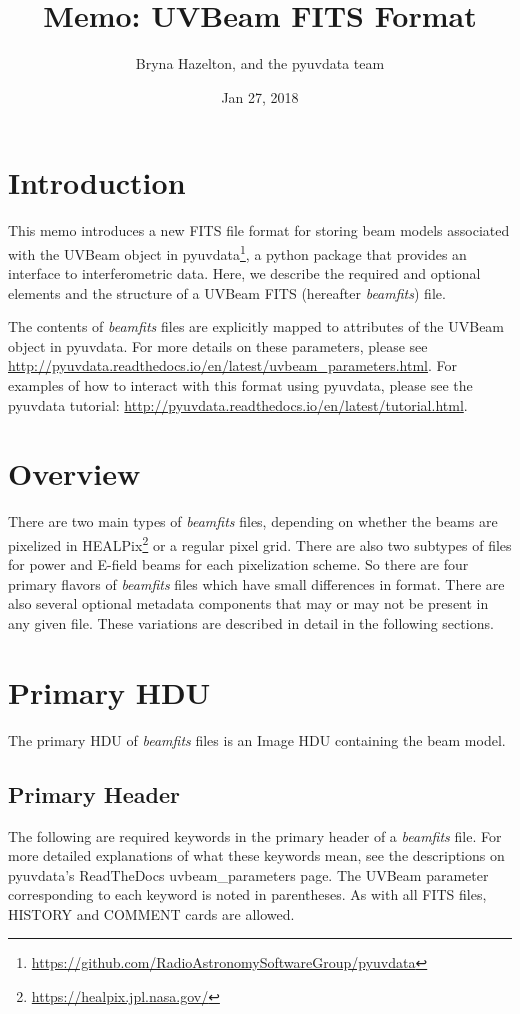 \documentclass[11pt, oneside]{article}   	%
\title{Memo: UVBeam FITS Format}
\author{Bryna Hazelton, and the pyuvdata team}
\date{Jan 27, 2018}							%
\begin{document}
\maketitle
\section{Introduction}
This memo introduces a new FITS file format for storing
beam models associated with the UVBeam object in
pyuvdata\footnote{\url{https://github.com/RadioAstronomySoftwareGroup/pyuvdata}}, a python package that
provides an interface to interferometric data. Here, we describe the required and optional elements
and the structure of a UVBeam FITS (hereafter \textit{beamfits}) file. 

The contents of \textit{beamfits} files are explicitly mapped to attributes of the UVBeam object in 
pyuvdata. For more details on these parameters, please see 
\url{http://pyuvdata.readthedocs.io/en/latest/uvbeam_parameters.html}.
For examples of how to interact with this format using pyuvdata, please see the
pyuvdata tutorial: \url{http://pyuvdata.readthedocs.io/en/latest/tutorial.html}.

\section{Overview}
There are two main types of \textit{beamfits} files, depending on whether the beams are 
pixelized in HEALPix\footnote{\url{https://healpix.jpl.nasa.gov/}} or a regular pixel grid. There are also two subtypes of files for power 
and E-field beams for each pixelization scheme. So there are four primary flavors of 
\textit{beamfits} files which have small differences in format. There are also several optional 
metadata components that may or may not be present in any given file. These variations are 
described in detail in the following sections.

\section{Primary HDU}
The primary HDU of \textit{beamfits} files is an Image HDU containing the beam model.

\subsection{Primary Header}
The following are required keywords in the primary header of a  \textit{beamfits} file. For more detailed explanations 
of what these keywords mean, see the descriptions on pyuvdata's ReadTheDocs uvbeam\_parameters page. 
The UVBeam parameter corresponding to each keyword is noted in parentheses.
As with all FITS files, HISTORY and COMMENT cards are allowed.
\end{document}
